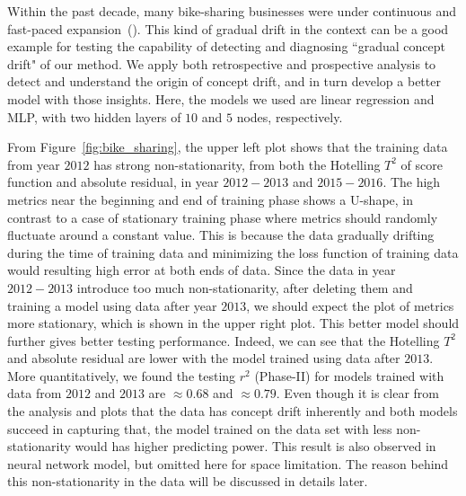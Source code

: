 \documentclass[twoside,11pt]{article}
\begin{document}
Within the past decade, many bike-sharing businesses were under continuous and fast-paced expansion~(\cite{shaheen2012public}). This kind of gradual drift in the context can be a good example for testing the capability of detecting and diagnosing ``gradual concept drift" of our method. We apply both retrospective and prospective analysis to detect and understand the origin of concept drift, and in turn develop a better model with those insights. Here, the models we used are linear regression and MLP, with two hidden layers of $10$ and $5$ nodes, respectively.

From Figure~\ref{fig:bike_sharing}, the upper left plot shows that the training data from year $2012$ has strong non-stationarity, from both the Hotelling $T^2$ of score function and absolute residual, in year $2012-2013$ and $2015-2016$. The high metrics near the beginning and end of training phase shows a U-shape, in contrast to a case of stationary training phase where metrics should randomly fluctuate around a constant value. This is because the data gradually drifting during the time of training data and minimizing the loss function of training data would resulting high error at both ends of data. Since the data in year $2012-2013$ introduce too much non-stationarity, after deleting them and training a model using data after year $2013$, we should expect the plot of metrics more stationary, which is shown in the upper right plot. This better model should further gives better testing performance. Indeed, we can see that the Hotelling $T^2$ and absolute residual are lower with the model trained using data after $2013$. More quantitatively, we found the testing $r^2$ (Phase-II) for models trained with data from $2012$ and $2013$ are $\approx0.68$ and $\approx0.79$. Even though it is clear from the analysis and plots that the data has concept drift inherently and both models succeed in capturing that, the model trained on the data set with less non-stationarity would has higher predicting power. This result is also observed in neural network model, but omitted here for space limitation. The reason behind this non-stationarity in the data will be discussed in details later.
\end{document}
